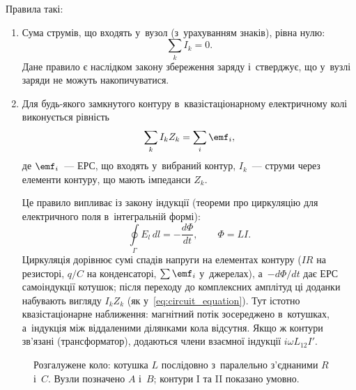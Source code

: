 Правила такі:

\begin{enumerate}

	\item  Сума струмів, що входять у~вузол (з~урахуванням знаків), рівна нулю:
	      \begin{equation*}
			      \sum_k I_k = 0.
	      \end{equation*}
	      Дане правило є наслідком закону збереження заряду і~стверджує, що у~вузлі заряди не можуть накопичуватися.

	\item Для будь-якого замкнутого контуру в~квазістаціонарному електричному колі виконується рівність
	      \begin{equation}\label{eq:Kirchhoff_voltage}
		      \sum_k I_k Z_k = \sum_i \emf_i,
	      \end{equation}
	      де $\emf_i$~--- ЕРС, що входять у~вибраний контур, $I_k$~--- струми через елементи контуру, що мають імпеданси $Z_k$.



	      Це правило випливає із закону індукції (теореми про циркуляцію для електричного поля в~інтегральній формі):
        \begin{equation*}
            \oint\limits_{\Gamma} E_l \, dl = -\frac{d\Phi}{dt}, \qquad \Phi = LI.
        \end{equation*}
	      Циркуляція дорівнює сумі спадів напруги на елементах контуру ($IR$ на резисторі, $q/C$ на конденсаторі, $\sum\emf_i$ у~джерелах), а~$-d\Phi/dt$ дає ЕРС самоіндукції котушок; після переходу до комплексних амплітуд ці доданки набувають вигляду $I_kZ_k$ (як у~\eqref{eq:circuit_equation}). Тут істотно квазістаціонарне наближення: магнітний потік зосереджено в~котушках, а~індукція між віддаленими ділянками кола відсутня. Якщо ж контури зв'язані (трансформатор), додаються члени взаємної індукції $i\omega L_{12}I'$.

\end{enumerate}

\begin{figure}[h!]
	\centering
	\caption{Розгалужене коло: котушка $L$ послідовно з~паралельно з'єднаними $R$ і~$C$. Вузли позначено $A$ і~$B$; контури I та II показано умовно.}
	\label{tikz:example_branched}
\end{figure}

